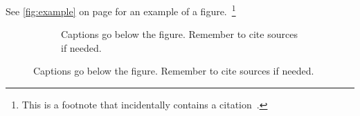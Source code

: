 See \autoref{fig:example} on page \pageref{fig:example} for an example of a
figure.~\footnote{This is a footnote that incidentally contains a
citation~\cite{example}.}
% 
\begin{figure}[!ht]
  \begin{subfigure}[b]{\textwidth}
% 
% 
% 
% 
    \caption{Captions go below the figure. Remember to cite sources if needed.}
    \label{fig:example:a}
  \end{subfigure}


\end{figure}
